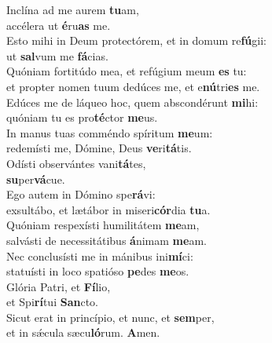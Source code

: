 \evenverse Inclína ad me aurem \textbf{tu}am,~\*\\
\evenverse accélera ut \textbf{é}ru\textbf{as} me.\\
\oddverse Esto mihi in Deum protectórem, et in domum re\textbf{fú}gii:~\*\\
\oddverse ut \textbf{sal}vum me \textbf{fá}cias.\\
\evenverse Quóniam fortitúdo mea, et refúgium meum \textbf{es} tu:~\*\\
\evenverse et propter nomen tuum dedúces me, et e\textbf{nú}tri\textbf{es} me.\\
\oddverse Edúces me de láqueo hoc, quem abscondérunt \textbf{mi}hi:~\*\\
\oddverse quóniam tu es pro\textbf{té}ctor \textbf{me}us.\\
\evenverse In manus tuas comméndo spíritum \textbf{me}um:~\*\\
\evenverse redemísti me, Dómine, Deus \textbf{ve}ri\textbf{tá}tis.\\
\oddverse Odísti observántes vani\textbf{tá}tes,~\*\\
\oddverse \textbf{su}per\textbf{vá}cue.\\
\evenverse Ego autem in Dómino spe\textbf{rá}vi:~\*\\
\evenverse exsultábo, et lætábor in miseri\textbf{cór}dia \textbf{tu}a.\\
\oddverse Quóniam respexísti humilitátem \textbf{me}am,~\*\\
\oddverse salvásti de necessitátibus \textbf{á}nimam \textbf{me}am.\\
\evenverse Nec conclusísti me in mánibus ini\textbf{mí}ci:~\*\\
\evenverse statuísti in loco spatióso \textbf{pe}des \textbf{me}os.\\
\oddverse Glória Patri, et \textbf{Fí}lio,~\*\\
\oddverse et Spi\textbf{rí}tui \textbf{San}cto.\\
\evenverse Sicut erat in princípio, et nunc, et \textbf{sem}per,~\*\\
\evenverse et in sǽcula sæcu\textbf{ló}rum. \textbf{A}men.\\
